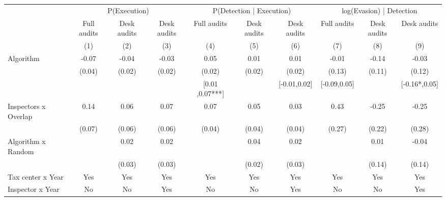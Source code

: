 \begin{tabular}{lccc|ccc|ccc} \toprule
\multicolumn{1}{l}{} & \multicolumn{3}{c}{P(Execution)} & \multicolumn{3}{c}{P(Detection | Execution)} & \multicolumn{3}{c}{log(Evasion) | Detection} \\\cmidrule(lr){2-4}\cmidrule(lr){5-7}\cmidrule(lr){8-10} \multicolumn{1}{l}{} & Full audits & Desk audits & Desk audits & Full audits & Desk audits & Desk audits & Full audits & Desk audits & Desk audits \\ \multicolumn{1}{l}{} & (1) & (2) & (3) & (4) & (5) & (6) & (7) & (8) & (9) \\ \midrule
Algorithm   &       -0.07\sym{**} &       -0.04         &       -0.03         &        0.05\sym{***}&        0.01         &        0.01         &       -0.01         &       -0.14         &       -0.03         \\
            &      (0.04)         &      (0.02)         &      (0.02)         &      (0.02)         &      (0.02)         &      (0.02)         &      (0.13)         &      (0.11)         &      (0.12)         \\
\addlinespace
 & & & & [0.01 ,0.07***] & & [-0.01,0.02] & [-0.09,0.05] & & [-0.16*,0.05] \\  Inspectors x Overlap&        0.14\sym{*}  &        0.06         &        0.07         &        0.07\sym{*}  &        0.05         &        0.03         &        0.43         &       -0.25         &       -0.25         \\
            &      (0.07)         &      (0.06)         &      (0.06)         &      (0.04)         &      (0.04)         &      (0.04)         &      (0.27)         &      (0.22)         &      (0.28)         \\
\addlinespace
Algorithm x Random&                     &        0.02         &        0.02         &                     &        0.04\sym{*}  &        0.02         &                     &        0.01         &       -0.04         \\
            &                     &      (0.03)         &      (0.03)         &                     &      (0.02)         &      (0.03)         &                     &      (0.14)         &      (0.14)         \\
\midrule
Tax center x Year&         Yes         &         Yes         &         Yes         &         Yes         &         Yes         &         Yes         &         Yes         &         Yes         &         Yes         \\
Inspector x Year&          No         &          No         &         Yes         &          No         &          No         &         Yes         &          No         &          No         &         Yes         \\

\end{tabular}
